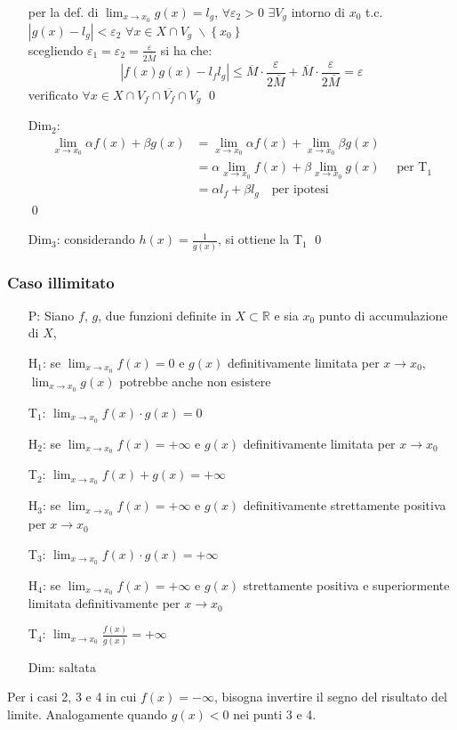 \documentclass[a4paper]{article}
\begin{document}
\begin{itemize}
	per la def. di \(\displaystyle \lim_{x \to x_0} g(x) = l_g\), \(\forall \varepsilon_2 > 0\) \(\exists V_g\) intorno di \(x_0\) t.c. \(\left| g(x) - l_g \right| < \varepsilon_2\) \(\forall x \in X \cap V_g \; \backslash \left\{ x_0 \right\}\) \\
	scegliendo \(\varepsilon_1 = \varepsilon_2 = \frac{\varepsilon}{2 \overline{M}}\) si ha che:
	\[\left| f(x) g(x) - l_f l_g \right| \leq \overline{M} \cdot \frac{\varepsilon}{2 \overline{M}} + \overline{M} \cdot \frac{\varepsilon}{2 \overline{M}} = \varepsilon\]
	verificato \(\forall x \in X \cap V_f \cap \overline{V_f} \cap V_g\) \qed
	\item[Dim\(_2\):] 
	\begin{align*}
		\lim_{x \to x_0} \alpha f(x) + \beta g(x) &= \lim_{x \to x_0} \alpha f(x) + \lim_{x \to x_0} \beta g(x) \\
		&= \alpha \lim_{x \to x_0} f(x) + \beta \lim_{x \to x_0} g(x) \quad \text{ per T}_1 \\
		&= \alpha l_f + \beta l_g \quad \text{per ipotesi}
	\end{align*} \qed
	\item[Dim\(_3\):] considerando \(h(x) = \frac{1}{g(x)}\), si ottiene la T\(_1\) \qed
\end{itemize}

\newpage

\subsubsection*{Caso illimitato}
\begin{itemize}
	\item[P:] Siano \(f\), \(g\), due funzioni definite in \(X \subset \mathbb{R}\) e sia \(x_0\) punto di accumulazione di \(X\),
	\item[H\(_1\):] se \(\displaystyle \lim_{x \to x_0} f(x) = 0\) e \(g(x)\) definitivamente limitata per \(x \to x_0\), \(\displaystyle \lim_{x \to x_0} g(x)\) potrebbe anche non esistere
	\item[T\(_1\):] \(\displaystyle \lim_{x \to x_0} f(x) \cdot g(x) = 0\)
	\item[H\(_{2}\):] se \(\displaystyle \lim_{x \to x_0} f(x) = + \infty\) e \(g(x)\) definitivamente limitata per \(x \to x_0\)
	\item[T\(_{2}\):] \(\displaystyle \lim_{x \to x_0} f(x) + g(x) = + \infty\)
	\item[H\(_{3}\):] se \(\displaystyle \lim_{x \to x_0} f(x) = + \infty\) e \(g(x)\) definitivamente strettamente positiva per \(x \to x_0\)
	\item[T\(_{3}\):] \(\displaystyle \lim_{x \to x_0} f(x) \cdot g(x) = + \infty\)
	\item[H\(_{4}\):] se \(\displaystyle \lim_{x \to x_0} f(x) = + \infty\) e \(g(x)\) strettamente positiva e superiormente limitata definitivamente per \(x \to x_0\)
	\item[T\(_{4}\):] \(\displaystyle \lim_{x \to x_0} \frac{f(x)}{g(x)} = + \infty\)
	\item[Dim:] saltata
\end{itemize}
Per i casi 2, 3 e 4 in cui \(f(x) = - \infty\), bisogna invertire il segno del risultato del limite. Analogamente quando \(g(x) < 0\) nei punti 3 e 4.
\end{document}
